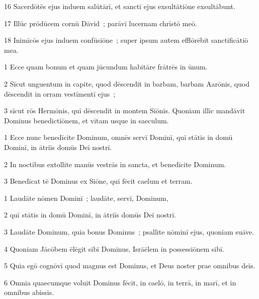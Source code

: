 \psalmVerse
  {\phantom{0}16}
  {Sacerdōtēs ejus induem salūtārī, et sanctī ejus exsultātiōne exsultābunt.}


\psalmVerse
  {\phantom{0}17}
  {Illūc prōdūcem cornū Dāvid~; parāvī lucernam chrīstō meō.}


\psalmVerse
  {\phantom{0}18}
  {Inimīcōs ejus induem confūsiōne~; super ipsum autem efflōrēbit sanctificātiō mea.}



\psalmVerse
  {\phantom{00}1}
  {Ecce quam bonum et quam jūcundum habitāre frātrēs in ūnum.}


\psalmVerse
  {\phantom{00}2}
  {Sīcut unguentum in capite, quod dēscendit in barbam, barbam Aarōnis, quod dēscendit in orram vestīmentī ejus~;}


\psalmVerse
  {\phantom{00}3}
  {sīcut rōs Hermōnis, quī dēscendit in montem Siōnis. Quoniam illīc mandāvit Dominus benedictiōnem, et vītam usque in saeculum.}



\psalmVerse
  {\phantom{00}1}
  {Ecce nunc benedīcite Dominum, omnēs servī Dominī, quī stātis in domū Dominī, in ātriīs domūs Deī nostrī.}


\psalmVerse
  {\phantom{00}2}
  {In noctibus extollite manūs vestrās in sancta, et benedīcite Dominum.}


\psalmVerse
  {\phantom{00}3}
  {Benedīcat tē Dominus ex Siōne, quī fēcit caelum et terram.}




\psalmVerse
  {\phantom{00}1}
  {Laudāte nōmen Dominī~; laudāte, servī, Dominum,}


\psalmVerse
  {\phantom{00}2}
  {quī stātis in domū Dominī, in ātriīs domūs Deī nostrī.}


\psalmVerse
  {\phantom{00}3}
  {Laudāte Dominum, quia bonus Dominus~; psallite nōminī ejus, quoniam suāve.}


\psalmVerse
  {\phantom{00}4}
  {Quoniam Jācōbem ēlēgit sibī Dominus, Isrāēlem in possessiōnem sibī.}


\psalmVerse
  {\phantom{00}5}
  {Quia egō cognōvī quod magnus est Dominus, et Deus noster prae omnibus deīs.}


\psalmVerse
  {\phantom{00}6}
  {Omnia quaecumque voluit Dominus fēcit, in caelō, in terrā, in marī, et in omnibus abissīs.}


